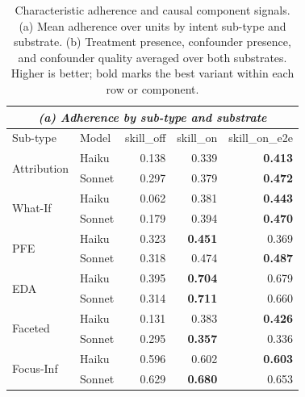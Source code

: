 \begin{table}[t]
\centering
\caption{Characteristic adherence and causal component signals. (a) Mean adherence over units by intent sub-type and substrate. (b) Treatment presence, confounder presence, and confounder quality averaged over both substrates. Higher is better; bold marks the best variant within each row or component.}
\label{tab:characteristic-subtype}
\scriptsize
\setlength{\tabcolsep}{4pt}
\begin{tabular}{llrrr}
\multicolumn{5}{c}{\textit{(a) Adherence by sub-type and substrate}} \\
\toprule
Sub-type & Model & skill\_off & skill\_on & skill\_on\_e2e \\
\midrule
\multirow{2}{*}{\textsf{Attribution}}
 & Haiku  & 0.138 & 0.339 & \textbf{0.413} \\
 & Sonnet & 0.297 & 0.379 & \textbf{0.472} \\
\cmidrule(lr){1-5}
\multirow{2}{*}{\textsf{What-If}}
 & Haiku  & 0.062 & 0.381 & \textbf{0.443} \\
 & Sonnet & 0.179 & 0.394 & \textbf{0.470} \\
\cmidrule(lr){1-5}
\multirow{2}{*}{\textsf{PFE}}
 & Haiku  & 0.323 & \textbf{0.451} & 0.369 \\
 & Sonnet & 0.318 & 0.474 & \textbf{0.487} \\
\cmidrule(lr){1-5}
\multirow{2}{*}{\textsf{EDA}}
 & Haiku  & 0.395 & \textbf{0.704} & 0.679 \\
 & Sonnet & 0.314 & \textbf{0.711} & 0.660 \\
\cmidrule(lr){1-5}
\multirow{2}{*}{\textsf{Faceted}}
 & Haiku  & 0.131 & 0.383 & \textbf{0.426} \\
 & Sonnet & 0.295 & \textbf{0.357} & 0.336 \\
\cmidrule(lr){1-5}
\multirow{2}{*}{\textsf{Focus-Inf}}
 & Haiku  & 0.596 & 0.602 & \textbf{0.603} \\
 & Sonnet & 0.629 & \textbf{0.680} & 0.653 \\
\bottomrule
\end{tabular}

\vspace{4pt}


\end{table}
